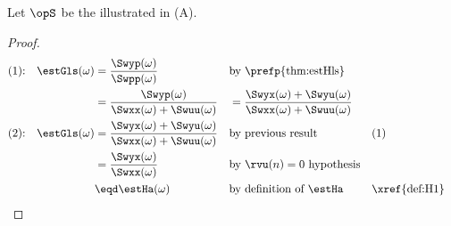 \begin{corollary}
\label{cor:H1LSa}
Let $\opS$ be the  illustrated in  (A).
\end{corollary}
\begin{proof}
  \begin{align*}
    \text{(1):\quad}\estGls(\omega)
      &= \frac{\Swyp(\omega)}{\Swpp(\omega)}
      && \text{by \prefp{thm:estHls}}
    \\&= \frac{\Swyp(\omega)}{\Swxx(\omega)+\Swuu(\omega)}
     &&= \frac{\Swyx(\omega)+\Swyu(\omega)}{\Swxx(\omega)+\Swuu(\omega)}
    \\
    \text{(2):\quad}\estGls(\omega)
      &= \frac{\Swyx(\omega)+\Swyu(\omega)}{\Swxx(\omega)+\Swuu(\omega)}
      && \text{by previous result}
      && \text{(1)}
    \\&= \frac{\Swyx(\omega)}{\Swxx(\omega)}
      && \text{by $\rvu(n)=0$ hypothesis}
    \\&\eqd \estHa(\omega)
      && \text{by definition of $\estHa$}
      && \text{\xref{def:H1}}
  \end{align*}
\end{proof}

